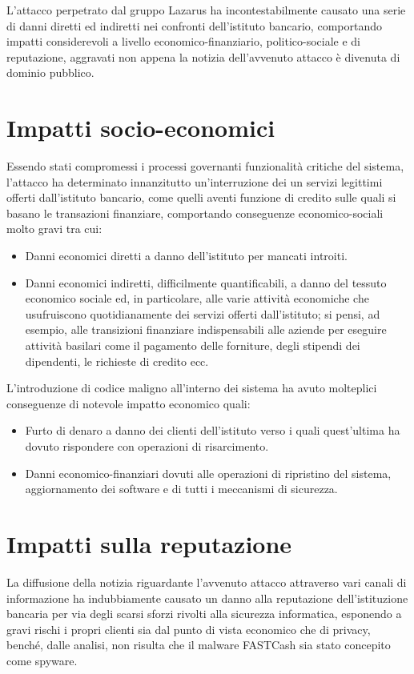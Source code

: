 \documentclass[10pt,a4paper, titlepage]{report}
\begin{document}
L'attacco perpetrato dal gruppo Lazarus ha incontestabilmente causato una serie di danni diretti ed indiretti nei confronti dell'istituto bancario, comportando impatti considerevoli a livello economico-finanziario, politico-sociale e di reputazione, aggravati non appena la notizia dell'avvenuto attacco è divenuta di dominio pubblico.

\section{Impatti socio-economici}

Essendo stati compromessi i processi governanti funzionalità critiche del sistema, l'attacco ha determinato innanzitutto un'interruzione dei un servizi legittimi offerti dall'istituto bancario, come quelli aventi funzione di credito sulle quali si basano le transazioni finanziare, comportando conseguenze economico-sociali molto gravi tra cui:
\begin{itemize}
\item Danni economici diretti a danno dell'istituto per mancati introiti.
\item Danni economici indiretti, difficilmente quantificabili, a danno del tessuto economico sociale ed, in particolare, alle varie attività economiche che usufruiscono quotidianamente dei servizi offerti dall'istituto; si pensi, ad esempio, alle transizioni finanziare indispensabili  alle aziende per eseguire attività basilari come il pagamento delle forniture, degli stipendi dei dipendenti, le richieste di credito ecc. 
\end{itemize}

L'introduzione di codice maligno all'interno dei sistema ha avuto molteplici conseguenze di notevole impatto economico quali:
\begin{itemize}
\item Furto di denaro a danno dei clienti dell'istituto verso i quali quest'ultima ha dovuto rispondere con operazioni di risarcimento. 
\item Danni economico-finanziari dovuti alle operazioni di ripristino del sistema, aggiornamento dei software e di tutti i meccanismi di sicurezza.
\end{itemize}

\section{Impatti sulla reputazione}

La diffusione della notizia riguardante l'avvenuto attacco attraverso vari canali di informazione ha indubbiamente causato un danno alla reputazione dell'istituzione bancaria per via degli scarsi sforzi rivolti alla sicurezza informatica, esponendo a gravi rischi i propri clienti sia dal punto di vista economico che di privacy, benché, dalle analisi, non risulta che il malware FASTCash sia stato concepito come spyware.
\end{document}
